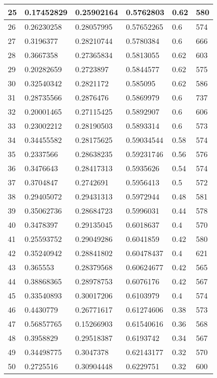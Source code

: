 \begin{longtable}{|l|l|l|l|l|l|}
25 & 0.17452829 & 0.25902164 & 0.5762803 & 0.62 & 580 \\ \hline 
26 & 0.26230258 & 0.28057995 & 0.57652265 & 0.6 & 574 \\ \hline 
27 & 0.3196377 & 0.28210744 & 0.5780384 & 0.6 & 666 \\ \hline 
28 & 0.3667358 & 0.27365834 & 0.5813055 & 0.62 & 603 \\ \hline 
29 & 0.20282659 & 0.2723897 & 0.5844577 & 0.62 & 575 \\ \hline 
30 & 0.32540342 & 0.2821172 & 0.585095 & 0.62 & 586 \\ \hline 
31 & 0.28735566 & 0.2876476 & 0.5869979 & 0.6 & 737 \\ \hline 
32 & 0.20001465 & 0.27115425 & 0.5892907 & 0.6 & 606 \\ \hline 
33 & 0.23002212 & 0.28190503 & 0.5893314 & 0.6 & 573 \\ \hline 
34 & 0.34455582 & 0.28175625 & 0.59034544 & 0.58 & 574 \\ \hline 
35 & 0.2337566 & 0.28638235 & 0.59231746 & 0.56 & 576 \\ \hline 
36 & 0.3476643 & 0.28417313 & 0.5935626 & 0.54 & 574 \\ \hline 
37 & 0.3704847 & 0.2742691 & 0.5956413 & 0.5 & 572 \\ \hline 
38 & 0.29405072 & 0.29431313 & 0.5972944 & 0.48 & 581 \\ \hline 
39 & 0.35062736 & 0.28684723 & 0.5996031 & 0.44 & 578 \\ \hline 
40 & 0.3478397 & 0.29135045 & 0.6018637 & 0.4 & 570 \\ \hline 
41 & 0.25593752 & 0.29049286 & 0.6041859 & 0.42 & 580 \\ \hline 
42 & 0.35240942 & 0.28841802 & 0.60478437 & 0.4 & 621 \\ \hline 
43 & 0.365553 & 0.28379568 & 0.60624677 & 0.42 & 565 \\ \hline 
44 & 0.38868365 & 0.28978753 & 0.6076176 & 0.42 & 567 \\ \hline 
45 & 0.33540893 & 0.30017206 & 0.6103979 & 0.4 & 574 \\ \hline 
46 & 0.4430779 & 0.26771617 & 0.61274606 & 0.38 & 573 \\ \hline 
47 & 0.56857765 & 0.15266903 & 0.61540616 & 0.36 & 568 \\ \hline 
48 & 0.3958829 & 0.29518387 & 0.6193742 & 0.34 & 567 \\ \hline 
49 & 0.34498775 & 0.3047378 & 0.62143177 & 0.32 & 570 \\ \hline 
50 & 0.2725516 & 0.30904448 & 0.6229751 & 0.32 & 600 \\ \hline 
\end{longtable}